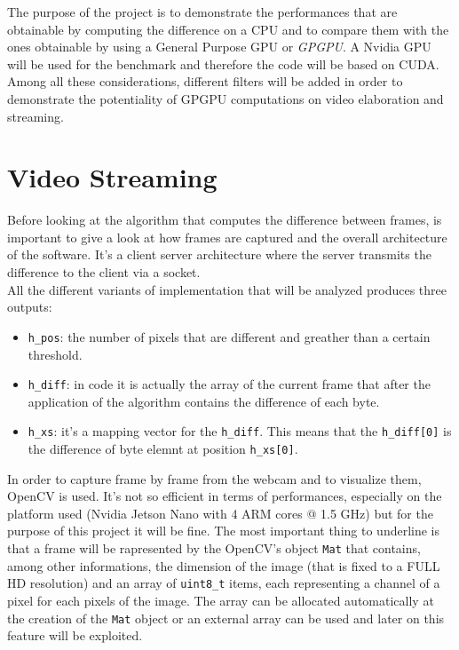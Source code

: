 \documentclass[paper=a4, fontsize=10pt]{scrartcl}	%
\begin{document}
	The purpose of the project is to demonstrate the performances that are obtainable by computing the difference on a CPU and to compare them with the ones obtainable by using a General Purpose GPU or \textit{GPGPU}. A Nvidia GPU will be used for the benchmark and therefore the code will be based on CUDA. Among all these considerations, different filters will be added in order to demonstrate the potentiality of GPGPU computations on video elaboration and streaming.

	\section{Video Streaming}

	Before looking at the algorithm that computes the difference between frames, is important to give a look at how frames are captured and the overall architecture of the software. It's a client server architecture where the server transmits the difference to the client via a socket.\\

	All the different variants of implementation that will be analyzed produces three outputs:

	\begin{itemize}
		\itemsep0sp
		\item \texttt{h\_pos}: the number of pixels that are different and greather than a certain threshold.
		\item \texttt{h\_diff}: in code it is actually the array of the current frame that after the application of the algorithm contains the difference of each byte.
		\item \texttt{h\_xs}: it's a mapping vector for the \texttt{h\_diff}. This means that the \texttt{h\_diff[0]} is the difference of byte elemnt at position \texttt{h\_xs[0]}.
	\end{itemize}
	 
	In order to capture frame by frame from the webcam and to visualize them, OpenCV is used. It's not so efficient in terms of performances, especially on the platform used (Nvidia Jetson Nano with 4 ARM cores @ 1.5 GHz) but for the purpose of this project it will be fine. The most important thing to underline is that a frame will be rapresented by the OpenCV's object \texttt{Mat} that contains, among other informations, the dimension of the image (that is fixed to a FULL HD resolution) and an array of \texttt{uint8\_t} items, each representing a channel of a pixel for each pixels of the image. The array can be allocated automatically at the creation of the \texttt{Mat} object or an external array can be used and later on this feature will be exploited.\\
\end{document}
